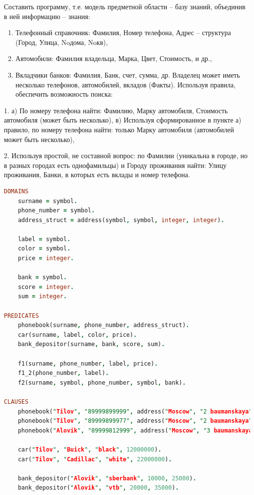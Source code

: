 \documentclass[a4paper,oneside,12pt]{extreport}
\begin{document}
\begin{task}
    Составить программу, т.е. модель предметной области – базу знаний, объединив в ней
    информацию – знания:
    \begin{enumerate}
        \item Телефонный справочник: Фамилия, Номер телефона, Адрес – структура (Город, Улица, Noдома, Noкв),
        \item Автомобили: Фамилия владельца, Марка, Цвет, Стоимость, и др.,
        \item Вкладчики банков: Фамилия, Банк, счет, сумма, др.
    Владелец может иметь несколько телефонов, автомобилей, вкладов (Факты).
    Используя правила, обеспечить возможность поиска:
    \end{enumerate}

    1. а) По номеру телефона найти: Фамилию, Марку автомобиля, Стоимость автомобиля
    (может быть несколько),
    в) Используя сформированное в пункте а) правило, по номеру телефона найти:
    только Марку автомобиля (автомобилей может быть несколько),
    
    2. Используя простой, не составной вопрос: по Фамилии (уникальна в городе, но в
    разных городах есть однофамильцы) и Городу проживания найти:
    Улицу
    проживания, Банки, в которых есть вклады и номер телефона.

    \begin{lstlisting}[language=Prolog]
DOMAINS 
	surname = symbol.
	phone_number = symbol.
	address_struct = address(symbol, symbol, integer, integer).

	label = symbol.
	color = symbol.
	price = integer.
	
	bank = symbol.
	score = integer.
	sum = integer.

PREDICATES
	phonebook(surname, phone_number, address_struct).
	car(surname, label, color, price).
	bank_depositor(surname, bank, score, sum).
	
	f1(surname, phone_number, label, price).
	f1_2(phone_number, label).
	f2(surname, symbol, phone_number, symbol, bank).

CLAUSES
	phonebook("Tilov", "89999899999", address("Moscow", "2 baumanskaya", 57, 25)).
	phonebook("Tilov", "89999899977", address("Moscow", "2 baumanskaya", 57, 25)).
	phonebook("Alovik", "89999812999", address("Moscow", "3 baumanskaya", 50, 75)).
	
	car("Tilov", "Buick", "black", 12000000).
	car("Tilov", "Cadillac", "white", 22000000).
	
	bank_depositor("Alovik", "sberbank", 10000, 25000).
	bank_depositor("Alovik", "vtb", 20000, 35000).
	

\end{lstlisting}
\end{task}
\end{document}
